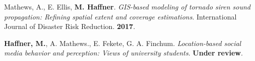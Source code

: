 




\begin{cventries}
   \cventry
      {}
      {}
      {}
      {}
      {
        \begin{cvitems}
          \vspace{-4mm}
        \item
          {Mathews, A., E. Ellis, \textbf{M. Haffner}.
            \textit{GIS-based modeling of tornado siren sound propagation:
              Refining spatial extent and coverage estimations}. International
            Journal of Disaster Risk Reduction. \textbf{2017}.} \\
          \vspace{-2mm}
        \end{cvitems}
    }
\end{cventries}




\begin{cventries}
   \cventry
      {}
      {}
      {}
      {}
      {
        \begin{cvitems}
          \vspace{-4mm}
        \item {\textbf{Haffner, M.}, A. Mathews., E. Fekete, G. A. Finchum.
            \textit{Location-based social media behavior and perception: Views
              of university students}. \textbf{Under review}.} \\
          \vspace{-2mm}
        \end{cvitems}
    }
\end{cventries}


